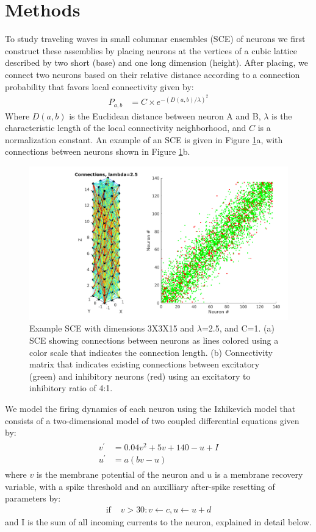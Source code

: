 \documentclass[a4paper,11pt]{article}
\begin{document}
\section{Methods}
To study traveling waves in small columnar ensembles (SCE) of neurons we first construct these assemblies by placing neurons at the vertices of a cubic lattice described by two short (base) and one long dimension (height). 
After placing, we connect two neurons based on their relative distance according to a connection probability that favors local connectivity given by: 
\begin{align}\label{eq:connectivity}
 P_{a,b} &= C \times e^{-(D(a,b)/\lambda)^2}
\end{align}
Where $D(a,b)$ is the Euclidean distance between neuron A and B, $\lambda$ is the characteristic length of the local connectivity neighborhood, and $C$ is a normalization constant.
An example of an SCE is given in Figure \ref{fig:column_structure}a, with connections between neurons shown in Figure \ref{fig:column_structure}b.
\begin{figure}[!ht]
 \caption{Example SCE with dimensions 3X3X15 and $\lambda$=2.5, and C=1. (a) SCE showing connections between neurons as lines colored using a color scale that indicates the connection length. (b) Connectivity matrix that indicates existing connections between excitatory (green) and inhibitory neurons (red) using an excitatory to inhibitory ratio of 4:1. }
 \label{fig:column_structure}
 \centering
   \includegraphics[width=\textwidth]{fig/lambda2}
\end{figure}

We model the firing dynamics of each neuron using the Izhikevich model \cite{izhikevich2003} that consists of a two-dimensional model of two coupled differential equations given by:
\begin{align}
 \begin{split}
  v^\prime &= 0.04v^2+5v+140-u+I \label{eq:neuron_v} \\
  u^\prime &= a(bv-u)
 \end{split}
\end{align}
where $v$ is the membrane potential of the neuron and $u$ is a membrane recovery variable, with a spike threshold and an auxilliary after-spike resetting of parameters by:
\begin{align}
  \text{if } &v>30: v\leftarrow c, u\leftarrow u+d
\end{align}
and I is the sum of all incoming currents to the neuron, explained in detail below. 
\end{document}
